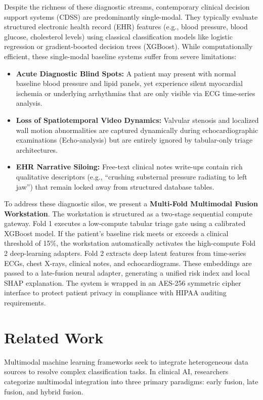 \documentclass[11pt,onecolumn]{article}
\begin{document}
Despite the richness of these diagnostic streams, contemporary clinical decision support systems (CDSS) are predominantly single-modal. They typically evaluate structured electronic health record (EHR) features (e.g., blood pressure, blood glucose, cholesterol levels) using classical classification models like logistic regression or gradient-boosted decision trees (XGBoost). While computationally efficient, these single-modal baseline systems suffer from severe limitations:
\begin{itemize}
    \item \textbf{Acute Diagnostic Blind Spots:} A patient may present with normal baseline blood pressure and lipid panels, yet experience silent myocardial ischemia or underlying arrhythmias that are only visible via ECG time-series analysis.
    \item \textbf{Loss of Spatiotemporal Video Dynamics:} Valvular stenosis and localized wall motion abnormalities are captured dynamically during echocardiographic examinations (Echo-analysis) but are entirely ignored by tabular-only triage architectures.
    \item \textbf{EHR Narrative Siloing:} Free-text clinical notes write-ups contain rich qualitative descriptors (e.g., ``crushing substernal pressure radiating to left jaw'') that remain locked away from structured database tables.
\end{itemize}

To address these diagnostic silos, we present a \textbf{Multi-Fold Multimodal Fusion Workstation}. The workstation is structured as a two-stage sequential compute gateway. Fold 1 executes a low-compute tabular triage gate using a calibrated XGBoost model. If the patient's baseline risk meets or exceeds a clinical threshold of 15\%, the workstation automatically activates the high-compute Fold 2 deep-learning adapters. Fold 2 extracts deep latent features from time-series ECGs, chest X-rays, clinical notes, and echocardiograms. These embeddings are passed to a late-fusion neural adapter, generating a unified risk index and local SHAP explanation. The system is wrapped in an AES-256 symmetric cipher interface to protect patient privacy in compliance with HIPAA auditing requirements.

\section{Related Work}
Multimodal machine learning frameworks seek to integrate heterogeneous data sources to resolve complex classification tasks. In clinical AI, researchers categorize multimodal integration into three primary paradigms: early fusion, late fusion, and hybrid fusion.
\end{document}

